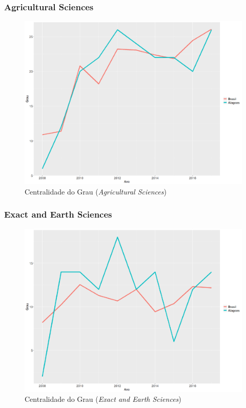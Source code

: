 \subsubsection{Agricultural Sciences}

\begin{figure}[H]
	\centering
	\includegraphics[scale=0.4]{Imagens/agricultural/graf-linha-degree-br-al.pdf}
	\caption{Centralidade do Grau (\textit{Agricultural Sciences})}
	\label{degree-agri}
\end{figure}

\subsubsection{Exact and Earth Sciences}

\begin{figure}[H]
	\centering
	\includegraphics[scale=0.4]{Imagens/exact/graf-linha-degree-br-al.pdf}
	\caption{Centralidade do Grau (\textit{Exact and Earth Sciences})}
	\label{degree-exact}
\end{figure}

